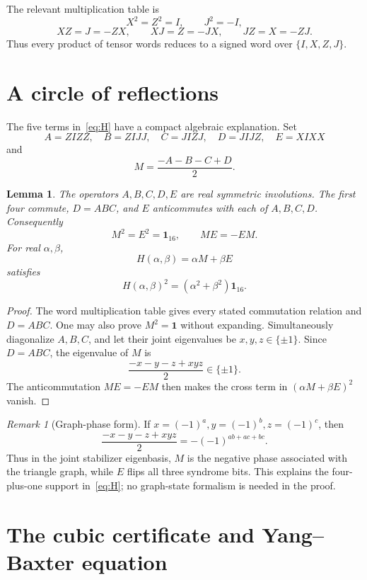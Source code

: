 \documentclass[11pt]{article}
\newtheorem{lemma}[theorem]{Lemma}
\theoremstyle{remark}
\newtheorem{remark}[theorem]{Remark}
\newcommand{\Id}{\mathbf 1}
\begin{document}
The relevant multiplication table is
\[
  X^2=Z^2=I,\qquad J^2=-I,
\]
\[
  XZ=J=-ZX,\qquad XJ=Z=-JX,\qquad JZ=X=-ZJ.
\]
Thus every product of tensor words reduces to a signed word over
\(\{I,X,Z,J\}\).

\section{A circle of reflections}\label{sec:reflection}

The five terms in~\eqref{eq:H} have a compact algebraic explanation.  Set
\[
  A=ZIZZ,\quad B=ZIJJ,\quad C=JIZJ,\quad D=JIJZ,\quad E=XIXX
\]
and
\begin{equation}
  M=\frac{-A-B-C+D}{2}.
  \label{eq:M}
\end{equation}

\begin{lemma}\label{lem:reflection}
The operators \(A,B,C,D,E\) are real symmetric involutions.
The first four commute, \(D=ABC\), and \(E\) anticommutes with each of
\(A,B,C,D\).  Consequently
\[
  M^2=E^2=\Id_{16},\qquad ME=-EM.
\]
For real \(\alpha,\beta\),
\[
  H(\alpha,\beta)=\alpha M+\beta E
\]
satisfies
\[
  H(\alpha,\beta)^2=(\alpha^2+\beta^2)\Id_{16}.
\]
\end{lemma}

\begin{proof}
The word multiplication table gives every stated commutation relation and
\(D=ABC\).  One may also prove \(M^2=\Id\) without expanding.  Simultaneously
diagonalize \(A,B,C\), and let their joint eigenvalues be
\(x,y,z\in\{\pm1\}\).  Since \(D=ABC\), the eigenvalue of \(M\) is
\[
  \frac{-x-y-z+xyz}{2}\in\{\pm1\}.
\]
The anticommutation \(ME=-EM\) then makes the cross term in
\((\alpha M+\beta E)^2\) vanish.
\end{proof}

\begin{remark}[Graph-phase form]
If \(x=(-1)^a,y=(-1)^b,z=(-1)^c\), then
\[
  \frac{-x-y-z+xyz}{2}=-(-1)^{ab+ac+bc}.
\]
Thus in the joint stabilizer eigenbasis, \(M\) is the negative phase
associated with the triangle graph, while \(E\) flips all three syndrome
bits.  This explains the four-plus-one support in~\eqref{eq:H}; no graph-state
formalism is needed in the proof.
\end{remark}

\section{The cubic certificate and Yang--Baxter equation}\label{sec:ybe}
\end{document}
